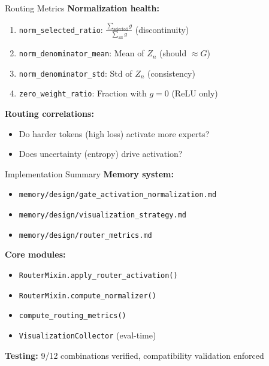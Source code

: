 \documentclass{beamer}
\begin{document}
\begin{frame}{Routing Metrics}
\textbf{Normalization health:}
\begin{enumerate}
    \item \texttt{norm\_selected\_ratio}: $\frac{\sum_{\text{selected}} g}{\sum_{\text{all}} g}$ (discontinuity)

    \item \texttt{norm\_denominator\_mean}: Mean of $Z_n$ (should $\approx G$)

    \item \texttt{norm\_denominator\_std}: Std of $Z_n$ (consistency)

    \item \texttt{zero\_weight\_ratio}: Fraction with $g=0$ (ReLU only)
\end{enumerate}

\vspace{0.3cm}
\textbf{Routing correlations:}
\begin{itemize}
    \item Do harder tokens (high loss) activate more experts?
    \item Does uncertainty (entropy) drive activation?
\end{itemize}
\end{frame}

\begin{frame}{Implementation Summary}
\textbf{Memory system:}
\begin{itemize}
    \item \texttt{memory/design/gate\_activation\_normalization.md}
    \item \texttt{memory/design/visualization\_strategy.md}
    \item \texttt{memory/design/router\_metrics.md}
\end{itemize}

\vspace{0.3cm}
\textbf{Core modules:}
\begin{itemize}
    \item \texttt{RouterMixin.apply\_router\_activation()}
    \item \texttt{RouterMixin.compute\_normalizer()}
    \item \texttt{compute\_routing\_metrics()}
    \item \texttt{VisualizationCollector} (eval-time)
\end{itemize}

\vspace{0.3cm}
\textbf{Testing:} 9/12 combinations verified, compatibility validation enforced
\end{frame}
\end{document}
